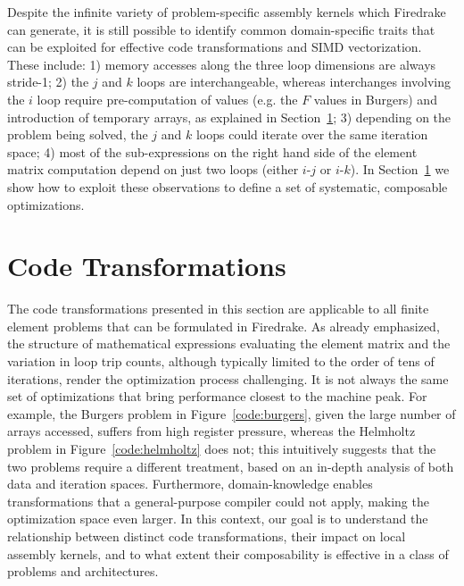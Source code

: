 \documentclass[conference]{IEEEtran}
\begin{document}
Despite the infinite variety of problem-specific assembly kernels which Firedrake can generate, it is still possible to identify common domain-specific traits that can be exploited for effective code transformations and SIMD vectorization. These include: 1) memory accesses along the three loop dimensions are always stride-1; 2) the $j$ and $k$ loops are interchangeable, whereas interchanges involving the $i$ loop require pre-computation of values (e.g. the $F$ values in Burgers) and introduction of temporary arrays, as explained in Section~\ref{sec:code-transf}; 3) depending on the problem being solved, the $j$ and $k$ loops could iterate over the same iteration space; 4) most of the sub-expressions on the right hand side of the element matrix computation depend on just two loops (either $i$-$j$ or $i$-$k$). In Section~\ref{sec:code-transf} we show how to exploit these observations to define a set of systematic, composable optimizations.


\section{Code Transformations}
\label{sec:code-transf}
The code transformations presented in this section are applicable to all finite element problems that can be formulated in Firedrake. As already emphasized, the structure of mathematical expressions evaluating the element matrix and the variation in loop trip counts, although typically limited to the order of tens of iterations, render the optimization process challenging. It is not always the same set of optimizations that bring performance closest to the machine peak. For example, the Burgers problem in Figure~\ref{code:burgers}, given the large number of arrays accessed, suffers from high register pressure, whereas the Helmholtz problem in Figure~\ref{code:helmholtz} does not; this intuitively suggests that the two problems require a different treatment, based on an in-depth analysis of both data and iteration spaces. Furthermore, domain-knowledge enables transformations that a general-purpose compiler could not apply, making the optimization space even larger. In this context, our goal is to understand the relationship between distinct code transformations, their impact on local assembly kernels, and to what extent their composability is effective in a class of problems and architectures.


\end{document}
